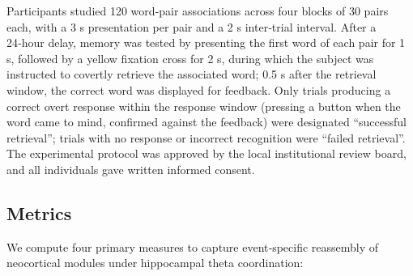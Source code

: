 \documentclass{article}
\begin{document}
Participants studied 120 word‑pair associations across four blocks of 30 pairs each, with a 3 s presentation per pair and a 2 s inter‑trial interval. After a 24‑hour delay, memory was tested by presenting the first word of each pair for 1 s, followed by a yellow fixation cross for 2 s, during which the subject was instructed to covertly retrieve the associated word; 0.5 s after the retrieval window, the correct word was displayed for feedback. Only trials producing a correct overt response within the response window (pressing a button when the word came to mind, confirmed against the feedback) were designated “successful retrieval”; trials with no response or incorrect recognition were “failed retrieval”. The experimental protocol was approved by the local institutional review board, and all individuals gave written informed consent.

\subsection{Metrics}
We compute four primary measures to capture event‑specific reassembly of neocortical modules under hippocampal theta coordination:
\end{document}
